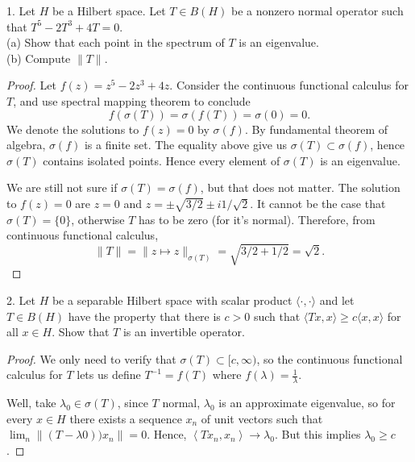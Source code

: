 
\begin{problem}
	1. Let $H$ be a Hilbert space. Let $T \in B(H)$ be a nonzero normal operator such that $T^5-2 T^3+4 T=0$.\\
(a) Show that each point in the spectrum of $T$ is an eigenvalue.\\
(b) Compute $\|T\|$.	
\end{problem}
\begin{proof}
	Let $f(z) = z^5 - 2 z^3 + 4 z$.
	Consider the continuous functional calculus for  $T$, and use spectral mapping theorem to conclude
	\[
		f(\sigma(T)) = \sigma(f(T)) = \sigma(0) = 0
	.\] 
	We denote the solutions to $f(z) = 0$ by $\sigma(f)$. By fundamental theorem of algebra, $\sigma(f)$ is a finite set. The equality above give us $\sigma(T) \subset \sigma(f)$, hence $\sigma(T)$ contains isolated points. Hence every element of $\sigma(T)$ is an eigenvalue.

	We are still not sure if $\sigma(T) = \sigma(f)$, but that does not matter. The solution to $f(z) = 0$ are $z = 0$ and $z = \pm \sqrt{3 / 2} \pm i 1 / \sqrt{2} $. It cannot be the case that $\sigma(T) = \{0\} $, otherwise $T$ has to be zero (for it's normal). Therefore, from continuous functional calculus,
	\[
		\|T\| = \|z \mapsto z\|_{\sigma(T)} = \sqrt{3 / 2 + 1 / 2} = \sqrt{2}  
	.\] 
\end{proof}

\begin{problem}
	2. Let $H$ be a separable Hilbert space with scalar product $\langle\cdot, \cdot\rangle$ and let $T \in B(H)$ have the property that there is $c>0$ such that $\langle T x, x\rangle \geq c\langle x, x\rangle$ for all $x \in H$. Show that $T$ is an invertible operator.
\end{problem}
\begin{proof}
	We only need to verify that $\sigma(T) \subset [c, \infty )$, so the continuous functional calculus for $T$ lets us define $T^{-1} = f(T)$ where $f(\lambda) = \frac{1}{\lambda}$.

	Well, take $\lambda_0 \in \sigma(T)$, since $T$ normal, $\lambda_0$ is an approximate eigenvalue, so for every $x \in H$ there exists a sequence $x_n$ of unit vectors such that $\lim_n \|(T - \lambda0)) x_n\| = 0$. Hence, $\left\langle T x _n, x_n \right\rangle  \to \lambda_0$. But this implies $\lambda_0 \ge c$.
\end{proof}

